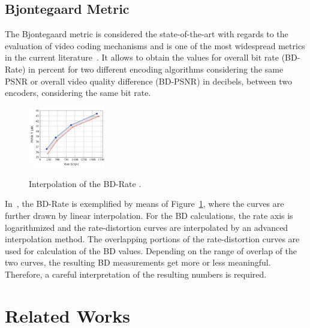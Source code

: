 \documentclass[journal]{IEEEtran}
\begin{document}
\subsection{Bjontegaard Metric}

The Bjontegaard metric is considered the state-of-the-art with regards to the evaluation of video coding mechanisms and is one of the most widespread metrics in the current literature~\cite{Bjontegaard:01}\cite{Mathias}. It allows to obtain the values for overall bit rate (BD-Rate) in percent for two different encoding algorithms considering the same PSNR or overall video quality difference (BD-PSNR) in decibels, between two encoders, considering the same bit rate. %

\FloatBarrier
\begin{figure}[!ht]
	\centering
	\caption{Interpolation of the BD-Rate \cite{Mathias}.}
	\includegraphics[width=0.3\textwidth]{figures/chartbdrate.png}
	\label{fig:chart_barate}
\end{figure}
\FloatBarrier


In~\cite{Mathias}, the BD-Rate is exemplified by means of Figure~\ref{fig:chart_barate}, where the curves are further drawn by linear interpolation. For the BD calculations, the rate axis is logarithmized and the rate-distortion curves are interpolated by an advanced interpolation method. The overlapping portions of the rate-distortion curves are used for calculation of the BD values. Depending on the range of overlap of the two curves, the resulting BD measurements get more or less meaningful. Therefore, a careful interpretation of the resulting numbers is required.




\section{Related Works}
\end{document}
